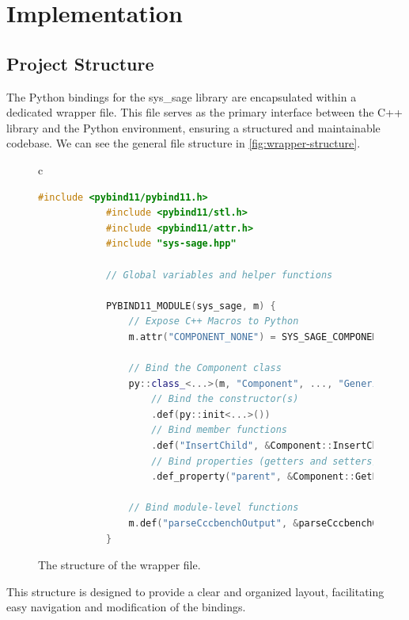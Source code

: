 \chapter{Implementation}\label{chapter:Implementation}

\section{Project Structure}

The Python bindings for the sys\_sage library are encapsulated within a dedicated wrapper file. This file serves as the primary interface between the C++ library and the Python environment, ensuring a structured and maintainable codebase. We can see the general file structure in \autoref{fig:wrapper-structure}.
\begin{figure}[h]
    \centering
    \begin{tabular}{c}
        \begin{lstlisting}[language=C++]
            #include <pybind11/pybind11.h>
            #include <pybind11/stl.h>
            #include <pybind11/attr.h>
            #include "sys-sage.hpp"
            
            // Global variables and helper functions
            
            PYBIND11_MODULE(sys_sage, m) {
                // Expose C++ Macros to Python
                m.attr("COMPONENT_NONE") = SYS_SAGE_COMPONENT_NONE;
            
                // Bind the Component class
                py::class_<...>(m, "Component", ..., "Generic Component")
                    // Bind the constructor(s)
                    .def(py::init<...>())
                    // Bind member functions
                    .def("InsertChild", &Component::InsertChild, ...)
                    // Bind properties (getters and setters)
                    .def_property("parent", &Component::GetParent, &Component::SetParent, ...);
            
                // Bind module-level functions
                m.def("parseCccbenchOutput", &parseCccbenchOutput, ...);
            }
            \end{lstlisting}
    \end{tabular}
    \caption[Structure of the wrapper file]{The structure of the wrapper file.}\label{fig:wrapper-structure}
  \end{figure}


This structure is designed to provide a clear and organized layout, facilitating easy navigation and modification of the bindings.\cite[see The Basics/First Steps]{pybind11-docu} 

